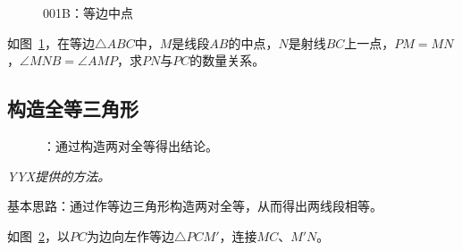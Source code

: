 

\begin{figure}[htbp]
  \centering
  \caption{001B：等边中点} \label{fig:001B}
\end{figure}

如图~\ref{fig:001B}，在等边$\triangle ABC$中，$M$是线段$AB$的中点，$N$是射线$BC$上一点，$PM = MN$，$\angle MNB = \angle AMP$，求$PN$与$PC$的数量关系。


\subsection{构造全等三角形} \label{subsec:001B-eqtri}

\begin{figure}[htbp]
  \centering
  \caption{：通过构造两对全等得出结论。}
  \label{fig:001B-eqtri}
\end{figure}

\emph{YYX提供的方法。}

基本思路：通过作等边三角形构造两对全等，从而得出两线段相等。

如图~\ref{fig:001B-eqtri}，以$PC$为边向左作等边$\triangle PCM'$，连接$MC$、$M'N$。

